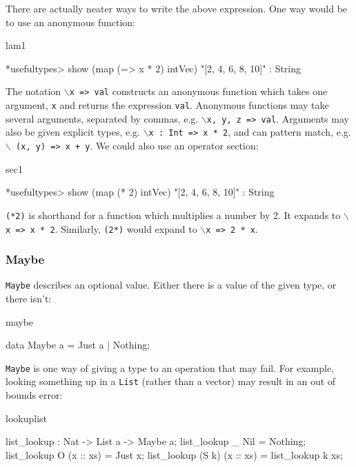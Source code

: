 There are actually neater ways to write the above expression. One way would be
to use an anonymous function:

\begin{SaveVerbatim}{lam1}

*usefultypes> show (map (\x => x * 2) intVec)
"[2, 4, 6, 8, 10]" : String

\end{SaveVerbatim}

\noindent
The notation \texttt{$\backslash$x => val} constructs an anonymous function
which takes one argument, \texttt{x} and returns the expression \texttt{val}.
Anonymous functions may take several arguments, separated by commas, e.g.
\texttt{$\backslash$x, y, z => val}. Arguments may also be given explicit
types, e.g. \texttt{$\backslash$x : Int => x * 2}, and can pattern match,
e.g. \texttt{$\backslash$ (x, y) => x + y}.
We could also use an operator section:

\begin{SaveVerbatim}{sec1}

*usefultypes> show (map (* 2) intVec)
"[2, 4, 6, 8, 10]" : String

\end{SaveVerbatim}

\noindent
\texttt{(*2)} is shorthand for a function which multiplies a number by 2. It expands to
\texttt{$\backslash$x => x * 2}. 
Similarly, \texttt{(2*)} would expand to \texttt{$\backslash$x => 2 * x}.

\subsubsection{Maybe}

\texttt{Maybe} describes an optional value. Either there is a value of the given type,
or there isn't:

\begin{SaveVerbatim}{maybe}

data Maybe a = Just a | Nothing;

\end{SaveVerbatim}

\texttt{Maybe} is one way of giving a type to an operation that may fail. For example,
looking something up in a \texttt{List} (rather than a vector) may result in an out of
bounds error:

\begin{SaveVerbatim}{lookuplist}

list_lookup : Nat -> List a -> Maybe a;
list_lookup _     Nil         = Nothing;
list_lookup O     (x :: xs) = Just x;
list_lookup (S k) (x :: xs) = list_lookup k xs;

\end{SaveVerbatim}

